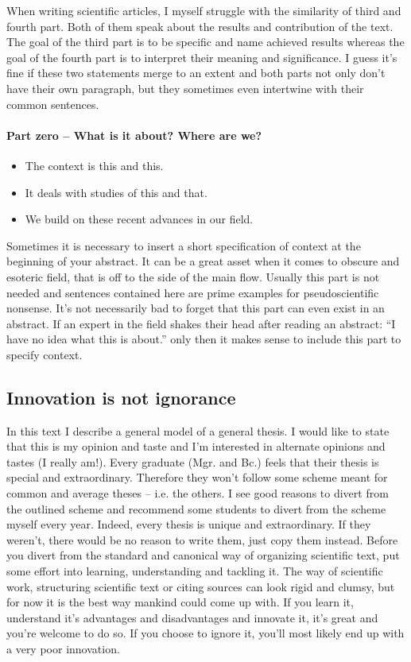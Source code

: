 When writing scientific articles, I myself struggle with the similarity of third and fourth part. Both of them speak about the results and contribution of the text. The goal of the third part is to be specific and name achieved results whereas the goal of the fourth part is to interpret their meaning and significance. I guess it's fine if these two statements merge to an extent and both parts not only don't have their own paragraph, but they sometimes even intertwine with their common sentences.

\paragraph{Part zero -- What is it about? Where are we?}
\begin{itemize}
  \item{The context is this and this.}
  \item{It deals with studies of this and that.}
  \item{We build on these recent advances in our field.}
\end{itemize}

Sometimes it is necessary to insert a short specification of context at the beginning of your abstract. It can be a great asset when it comes to obscure and esoteric field, that is off to the side of the main flow. Usually this part is not needed and sentences contained here are prime examples for pseudoscientific nonsense. It's not necessarily bad to forget that this part can even exist in an abstract. If an expert in the field shakes their head after reading an abstract: ``I have no idea what this is about.'' only then it makes sense to include this part to specify context.


\subsection*{Innovation is not ignorance}

In this text I describe a general model of a general thesis. I would like to state that this is my opinion and taste and I'm interested in alternate opinions and tastes (I really am!). Every graduate (Mgr. and Bc.) feels that their thesis is special and extraordinary. Therefore they won't follow some scheme meant for common and average theses -- i.e. the others. I see good reasons to divert from the outlined scheme and recommend some students to divert from the scheme myself every year. Indeed, every thesis is unique and extraordinary. If they weren't, there would be no reason to write them, just copy them instead. Before you divert from the standard and canonical way of organizing scientific text, put some effort into learning, understanding and tackling it. The way of scientific work, structuring scientific text or citing sources can look rigid and clumsy, but for now it is the best way mankind could come up with. If you learn it, understand it's advantages and disadvantages and innovate it, it's great and you're welcome to do so. If you choose to ignore it, you'll most likely end up with a very poor innovation.


